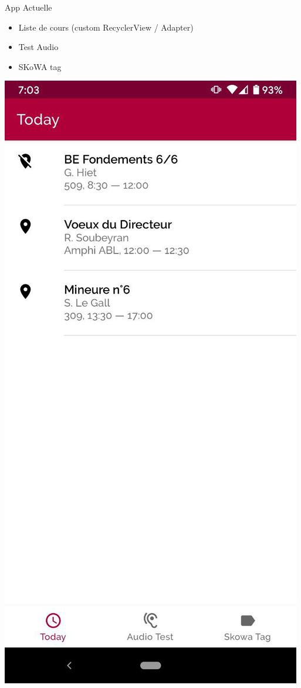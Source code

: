 \documentclass[aspectratio=169]{beamer}
\begin{document}
\begin{frame}{App Actuelle}

  \begin{minipage}{.4\textwidth}
    \begin{itemize}
      \item Liste de cours (custom RecyclerView / Adapter)
      \item Test Audio
      \item SKoWA tag
    \end{itemize}
  \end{minipage}%
  \begin{minipage}{.3\textwidth}
    \centering
    \includegraphics[height=.8\textheight]{../assets/android1}

\end{minipage}
\end{frame}
\end{document}
